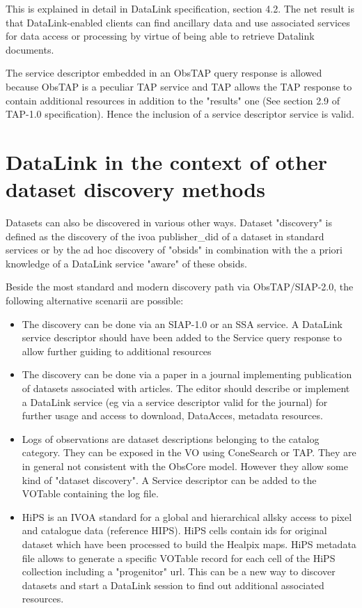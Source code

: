 \documentclass[11pt,a4paper]{ivoa}
\begin{document}
This is explained in  detail in DataLink specification, section 4.2. The net result is that DataLink-enabled clients can find ancillary data and use associated services for data access or processing by virtue of being able to retrieve Datalink documents. 

The service descriptor embedded in an ObsTAP query response is allowed because ObsTAP is a peculiar TAP service and TAP allows the TAP response to contain additional resources in addition to the "results" one (See section 2.9 of TAP-1.0 specification).  Hence the inclusion of a service descriptor service is valid.


\section{DataLink in the context of other dataset discovery methods} 
Datasets can also be discovered in various other ways. Dataset "discovery" is defined as the discovery of the ivoa publisher\_did of a dataset in standard services or by the ad hoc discovery of "obsids" in combination with the a priori knowledge of a DataLink service "aware" of these obsids.

Beside the most standard and modern discovery path via ObsTAP/SIAP-2.0, the following alternative scenarii are possible: 
\begin{itemize}
\item The discovery can be done via an SIAP-1.0 or an SSA service. A DataLink service descriptor should have been added to the Service query response to allow further guiding to additional resources 
\item The discovery can be done via a paper in a journal implementing  publication of datasets associated with articles. The editor should describe or implement a DataLink service (eg via a service descriptor valid for the journal) for further usage and access to download, DataAcces, metadata resources. 
\item  Logs of observations are dataset descriptions belonging to the catalog category. They can be exposed in the VO using ConeSearch or TAP. They are in general not consistent with the ObsCore model. However they allow some kind of "dataset discovery". A Service descriptor can be added to the VOTable containing the log file. 
\item HiPS  is an IVOA standard for a global and hierarchical 	allsky access to pixel and catalogue data (reference HIPS). HiPS cells contain ids for original dataset which have been processed to build the Healpix maps. HiPS metadata file allows to generate a specific VOTable record for each cell of the HiPS collection including a "progenitor" url. This can be a new way to discover datasets and start a DataLink session to find out additional associated resources.   
\end{itemize}
\end{document}
